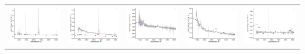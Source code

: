 \begin{center}
\begin{longtable}{l l l l l }
    \includegraphics[width=0.2\linewidth, clip]{Figs/Figs-sdss/spec-0285-51930-0042-SPLUS-n02s23-042426.pdf} & \includegraphics[width=0.2\linewidth, clip]{Figs/Figs-sdss/spec-0285-51930-0049-SPLUS-n02s23-042530.pdf} & \includegraphics[width=0.2\linewidth, clip]{Figs/Figs-sdss/spec-0285-51930-0521-SPLUS-n02n23-022190.pdf} & \includegraphics[width=0.2\linewidth, clip]{Figs/Figs-sdss/spec-0285-51930-0549-SPLUS-n01s23-038457.pdf} & \includegraphics[width=0.2\linewidth, clip]{Figs/Figs-sdss/spec-0287-52023-0264-SPLUS-n02s24-039734.pdf} \\

\end{longtable}
\end{center}
